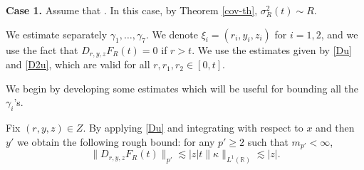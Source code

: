 \documentclass[12pt]{article}
\def\cF{\mathcal{F}}
\def\bR{\mathbb{R}}
\newcommand{\les}{\lesssim}
\def\k{\kappa}
\begin{document}
\medskip


{\bf Case 1.} Assume that \fbox{$\k \in L^1(\bR)$}. In this case, by Theorem \ref{cov-th}, $\sigma_R^2(t) \sim  R$. 

\medskip

We estimate separately $\gamma_1,\ldots,\gamma_7$. We denote $\xi_i=(r_i,y_i,z_i)$ for $i=1,2$, and we use the fact that $D_{r,y,z}F_R(t)=0$ if $r>t$.
We use the estimates given by \eqref{Du} and \eqref{D2u}, which are valid for all $r,r_1,r_2 \in [0,t]$. 

We begin by developing some estimates which will be useful for bounding all the $\gamma_i$'s.



Fix $(r,y,z) \in Z$. By applying \eqref{Du} and integrating with respect to $x$ and then $y'$ we obtain the following rough bound: for any $p'\geq 2$ such that $m_{p'}<\infty$,
\begin{equation}
\label{Du trivial}
\|D_{r,y,z}F_R(t)\|_{p'} \les |z|t\|\k\|_{L^1(\bR)} \les |z|.
\end{equation}
\end{document}
